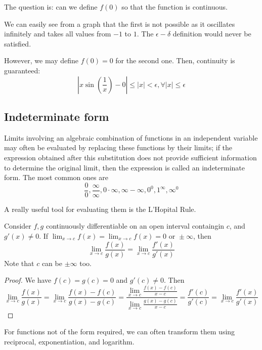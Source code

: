 \documentclass[11pt]{article}
\begin{document}
The question is: can we define \(f(0)\) so that the function is continuous.

We can easily see from a graph that the first is not possible as it oscillates infinitely and takes all values from \(-1\) to \(1\). The \(\epsilon - \delta\) definition would never be satisfied.

However, we may define \(f(0)=0\) for the second one. Then, continuity is guaranteed:
\[|x\sin \left(\frac{1}{x}\right)-0| \leq |x| < \epsilon, \forall |x|\leq \epsilon\]

\subsection{Indeterminate form}
Limits involving an algebraic combination of functions in an independent variable may often be evaluated by replacing these functions by their limits; if the expression obtained after this substitution does not provide sufficient information to determine the original limit, then the expression is called an indeterminate form. The most common ones are
\[\frac{0}{0}, \frac{\infty}{\infty}, 0\cdot\infty, \infty-\infty, 0^0, 1^\infty, \infty^0\]

A really useful tool for evaluating them is the L'Hopital Rule.

\begin{theorem}
  Consider \(f,g\) continuously differentiable on an open interval containgin \(c\), and \(g'(x)\neq 0\).
  If \(\lim_{x\to c}f(x) = \lim_{x\to c}f(x) = 0 \text{ or } \pm\infty\), then
  \begin{equation*}
    \lim_{x\to c}\frac{f(x)}{g(x)} = \lim_{x\to c}\frac{f'(x)}{g'(x)} 
  \end{equation*}
  Note that \(c\) can be \(\pm\infty\) too.
\end{theorem}
\begin{proof}
  We have \(f(c)=g(c)=0\) and \(g'(c)\neq 0\). Then
  \begin{equation*}
    \lim_{x\to c}\frac{f(x)}{g(x)} = \lim_{x\to c}\frac{f(x)-f(c)}{g(x)-g(c)} = \frac{\lim_{x\to c}\frac{f(x)-f(c)}{x-c}}{\lim_{x\to c}\frac{g(x)-g(c)}{x-c}} = \frac{f'(c)}{g'(c)} = \lim_{x\to c}\frac{f'(x)}{g'(x)}
  \end{equation*}
\end{proof}
For functions not of the form required, we can often transform them using reciprocal, exponentiation, and logarithm.
\end{document}
